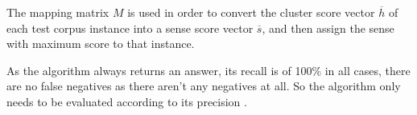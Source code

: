 The mapping matrix $M$ is used in order to convert the cluster score vector
$\overline{h}$ of each test corpus instance into a sense score vector
$\overline{s}$, and then assign the sense with maximum score to that instance.

As the algorithm always returns an answer, its recall is of 100\% in all
cases, there are no false negatives as there aren't any negatives at all. So
the algorithm only needs to be evaluated according to its precision
\cite{agirre2006evaluating}.


